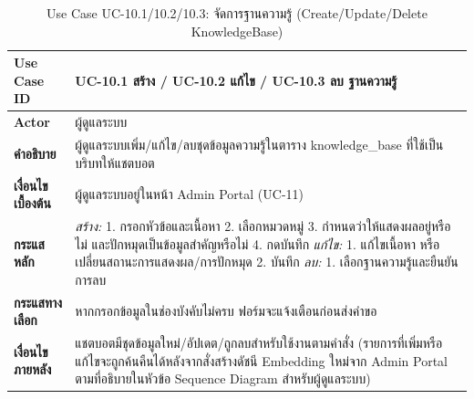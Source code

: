 \begin{table}[H]
\centering
\caption{Use Case UC-10.1/10.2/10.3: จัดการฐานความรู้ (Create/Update/Delete KnowledgeBase)}
\label{tab:uc10}
\begin{tabular}{|p{3.2cm}|p{10cm}|}
\hline
\textbf{Use Case ID} & UC-10.1 สร้าง / UC-10.2 แก้ไข / UC-10.3 ลบ ฐานความรู้ \\ \hline
\textbf{Actor} & ผู้ดูแลระบบ \\ \hline
\textbf{คำอธิบาย} & ผู้ดูแลระบบเพิ่ม/แก้ไข/ลบชุดข้อมูลความรู้ในตาราง knowledge\_base ที่ใช้เป็นบริบทให้แชตบอต \\ \hline
\textbf{เงื่อนไขเบื้องต้น} & ผู้ดูแลระบบอยู่ในหน้า Admin Portal (UC-11) \\ \hline
\textbf{กระแสหลัก} & \textit{สร้าง:} 1. กรอกหัวข้อและเนื้อหา 2. เลือกหมวดหมู่ 3. กำหนดว่าให้แสดงผลอยู่หรือไม่ และปักหมุดเป็นข้อมูลสำคัญหรือไม่ 4. กดบันทึก \newline \textit{แก้ไข:} 1. แก้ไขเนื้อหา หรือเปลี่ยนสถานะการแสดงผล/การปักหมุด 2. บันทึก \newline \textit{ลบ:} 1. เลือกฐานความรู้และยืนยันการลบ \\ \hline
\textbf{กระแสทางเลือก} & หากกรอกข้อมูลในช่องบังคับไม่ครบ ฟอร์มจะแจ้งเตือนก่อนส่งคำขอ \\ \hline
\textbf{เงื่อนไขภายหลัง} & แชตบอตมีชุดข้อมูลใหม่/อัปเดต/ถูกลบสำหรับใช้งานตามคำสั่ง (รายการที่เพิ่มหรือแก้ไขจะถูกค้นคืนได้หลังจากสั่งสร้างดัชนี Embedding ใหม่จาก Admin Portal ตามที่อธิบายในหัวข้อ Sequence Diagram สำหรับผู้ดูแลระบบ) \\
\hline
\end{tabular}
\end{table}

